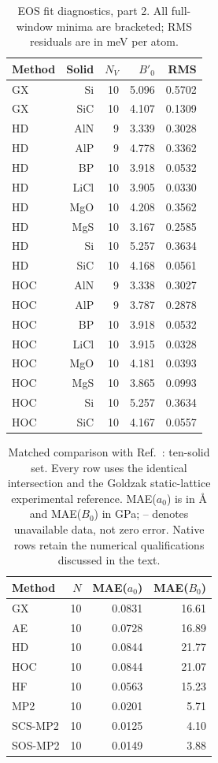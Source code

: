 \begin{table}[t]
\centering
\small
\caption{EOS fit diagnostics, part 2. All full-window minima are bracketed; RMS residuals are in meV per atom.}
\label{tab:eos-fit-2}
\begin{tabular}{lrrrr}
\toprule
Method & Solid & $N_V$ & $B'_0$ & RMS \\
\midrule
GX & Si & 10 & 5.096 & 0.5702 \\
GX & SiC & 10 & 4.107 & 0.1309 \\
HD & AlN & 9 & 3.339 & 0.3028 \\
HD & AlP & 9 & 4.778 & 0.3362 \\
HD & BP & 10 & 3.918 & 0.0532 \\
HD & LiCl & 10 & 3.905 & 0.0330 \\
HD & MgO & 10 & 4.208 & 0.3562 \\
HD & MgS & 10 & 3.167 & 0.2585 \\
HD & Si & 10 & 5.257 & 0.3634 \\
HD & SiC & 10 & 4.168 & 0.0561 \\
HOC & AlN & 9 & 3.338 & 0.3027 \\
HOC & AlP & 9 & 3.787 & 0.2878 \\
HOC & BP & 10 & 3.918 & 0.0532 \\
HOC & LiCl & 10 & 3.915 & 0.0328 \\
HOC & MgO & 10 & 4.181 & 0.0393 \\
HOC & MgS & 10 & 3.865 & 0.0993 \\
HOC & Si & 10 & 5.257 & 0.3634 \\
HOC & SiC & 10 & 4.167 & 0.0557 \\
\bottomrule
\end{tabular}
\end{table}

\begin{table}[t]
\centering
\small
\caption{Matched comparison with Ref.~: ten-solid set. Every row uses the identical intersection and the Goldzak static-lattice experimental reference. MAE($a_0$) is in \AA{} and MAE($B_0$) in GPa; -- denotes unavailable data, not zero error. Native rows retain the numerical qualifications discussed in the text.}
\label{tab:literature-Goldzak2022}
\begin{tabular}{lrrr}
\toprule
Method & $N$ & MAE($a_0$) & MAE($B_0$) \\
\midrule
GX & 10 & 0.0831 & 16.61 \\
AE & 10 & 0.0728 & 16.89 \\
HD & 10 & 0.0844 & 21.77 \\
HOC & 10 & 0.0844 & 21.07 \\
HF & 10 & 0.0563 & 15.23 \\
MP2 & 10 & 0.0201 & 5.71 \\
SCS-MP2 & 10 & 0.0125 & 4.10 \\
SOS-MP2 & 10 & 0.0149 & 3.88 \\
\bottomrule
\end{tabular}
\end{table}

